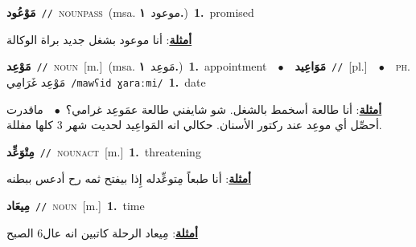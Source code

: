 \documentclass[10pt,a4paper,twoside]{article} %
\begin{document}
\begin{multicols}{2}
{\setlength\topsep{0pt}\textbf{\foreignlanguage{arabic}{مَوْعُود}}\ {\color{gray}\texttt{//}\color{black}}\ \textsc{noun\textunderscore pass}\ \color{gray}(msa. \foreignlanguage{arabic}{موعود}~\foreignlanguage{arabic}{\textbf{١.}})\color{black}\ \textbf{1.}~promised\  \begin{flushright}\color{gray}\foreignlanguage{arabic}{\textbf{\underline{\foreignlanguage{arabic}{أمثلة}}}: أنا موعود بشغل جديد براة الوكالة}\end{flushright}\color{black}} \vspace{2mm}

{\setlength\topsep{0pt}\textbf{\foreignlanguage{arabic}{مَوْعِد}}\ {\color{gray}\texttt{//}\color{black}}\ \textsc{noun}\ [m.]\ \color{gray}(msa. \foreignlanguage{arabic}{مَوعِد}~\foreignlanguage{arabic}{\textbf{١.}})\color{black}\ \textbf{1.}~appointment\ \ $\bullet$\ \ \setlength\topsep{0pt}\textbf{\foreignlanguage{arabic}{مَوَاعِيد}}\ {\color{gray}\texttt{//}\color{black}}\ [pl.]\ \ $\bullet$\ \ \textsc{ph.} \color{gray} \foreignlanguage{arabic}{مَوْعِد غَرَامِي}\color{black}\ {\color{gray}\texttt{/{\sffamily mawʕid ɣaraːmi}/}\color{black}}\ \textbf{1.}~date\  \begin{flushright}\color{gray}\foreignlanguage{arabic}{\textbf{\underline{\foreignlanguage{arabic}{أمثلة}}}: أنا طالعة أسخمط بالشغل. شو شايفني طالعة عمَوعِد غرامي؟\ $\bullet$\ \  ماقدرت أحصِّل أي موعِد عند ركتور الأسنان. حكالي انه المَواعِيد لحديت شهر 3 كلها مفللة.}\end{flushright}\color{black}} \vspace{2mm}

{\setlength\topsep{0pt}\textbf{\foreignlanguage{arabic}{مِتْوَعِّد}}\ {\color{gray}\texttt{//}\color{black}}\ \textsc{noun\textunderscore act}\ [m.]\ \textbf{1.}~threatening\  \begin{flushright}\color{gray}\foreignlanguage{arabic}{\textbf{\underline{\foreignlanguage{arabic}{أمثلة}}}: أنا طبعاً مِتوعِّدله إِذا بيفتح ثمه رح أدعس ببطنه}\end{flushright}\color{black}} \vspace{2mm}

{\setlength\topsep{0pt}\textbf{\foreignlanguage{arabic}{مِيعَاد}}\ {\color{gray}\texttt{//}\color{black}}\ \textsc{noun}\ [m.]\ \textbf{1.}~time\  \begin{flushright}\color{gray}\foreignlanguage{arabic}{\textbf{\underline{\foreignlanguage{arabic}{أمثلة}}}: مِيعاد الرحلة كاتبين انه عال6 الصبح}\end{flushright}\color{black}} \vspace{2mm}


\end{multicols}
\end{document}
